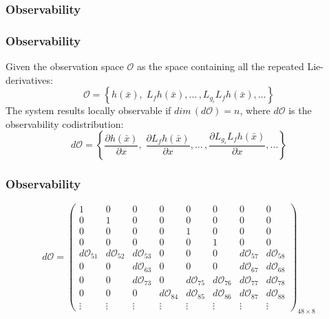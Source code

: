 \subsubsection{Observability}
\begin{frame}
\frametitle{Observability}
Given the observation space $\mathcal{O}$ as the space containing all the repeated Lie-derivatives:
\[
\mathcal{O} = \left\{h(\bar{x}),\;L_fh(\bar{x}),...\,,L_{g_i}L_fh(\bar{x}),...\right\}
\]
The system results locally observable if $dim\,(d\mathcal{O}) = n$, where $d\mathcal{O}$ is the observability codistribution:
\[
d\mathcal{O} = \left\{\frac{\partial h(\bar{x})}{\partial x},\;\frac{\partial L_fh(\bar{x})}{\partial x},...\,,\frac{\partial L_{g_i}L_fh(\bar{x})}{\partial x},...\right\}
\]
\end{frame}
%
%
\begin{frame}
\frametitle{Observability}
\begin{equation*}
	d\mathcal{O} =%
	\begin{pmatrix}
		1 &0 &0 &0 &0 &0 &0 &0 \\
		0 &1 &0 &0 &0 &0 &0 &0 \\
		0 &0 &0 &0 &1 &0 &0 &0 \\
		0 &0 &0 &0 &0 &1 &0 &0 \\
	    d\mathcal{O}_{51} &d\mathcal{O}_{52} &d\mathcal{O}_{53} &0 &0 &0 &d\mathcal{O}_{57} &d\mathcal{O}_{58} \\
		0 &0 &d\mathcal{O}_{63} &0 &0 &0 &d\mathcal{O}_{67} &d\mathcal{O}_{68} \\
		0 &0 &d\mathcal{O}_{73} &0 &d\mathcal{O}_{75} &d\mathcal{O}_{76} &d\mathcal{O}_{77} &d\mathcal{O}_{78} \\
		0 &0 &0 &d\mathcal{O}_{84} &d\mathcal{O}_{85} &d\mathcal{O}_{86} &d\mathcal{O}_{87} &d\mathcal{O}_{88} \\
		\vdots &\vdots &\vdots &\vdots &\vdots &\vdots &\vdots &\vdots
	\end{pmatrix}_{48\times8}
\end{equation*}
\end{frame}
